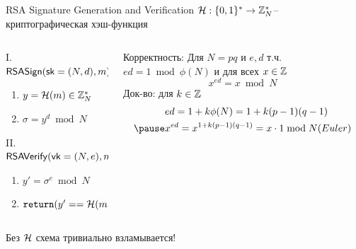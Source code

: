 \documentclass[usenames,dvipsnames,8pt,aspectratio=169]{beamer}
\begin{document}
\begin{frame}{RSA Signature Generation and Verification}
\large
$\mathcal{H}: \{0,1\}^\ast \rightarrow {{\mathbb Z}}_N^\ast$-- криптографическая хэш-функция
\vspace{10pt}
\begin{columns}[t]
\begin{column}{0.45\textwidth}
	
	{\color{Orange} I. $\mathsf{RSASign}(\textsf{sk}=(N, d), m):$}
	\begin{enumerate}
		\itemsep5pt
		\item $y = \mathcal{H}(m) \in {{\mathbb Z}}_N^\ast$
		\item $\sigma = y^d \bmod N$
	\end{enumerate}
	\vspace{10pt}
	\pause
	{\color{Orange} II. $\mathsf{RSAVerify}(\textsf{vk}=(N, e), m, \sigma):$}
	\begin{enumerate}
		\itemsep5pt
		\item $y' = \sigma^e \bmod N$
		\item $\mathtt{return}(y'==\mathcal{H}(m))$ \\
	\end{enumerate}
\end{column}
\begin{column}{0.55\textwidth}
	\pause
	{\color{Orange} Корректность:}
	Для $N=pq$ и $e,d$ т.ч.\ $ed = 1 \bmod \phi(N)$ и для всех $x \in {{\mathbb Z}}$
	{\color{Orange} 
		\[
		x^{ed} = x \bmod N
		\] }
	\pause
	Док-во: для $k \in {{\mathbb Z}}$
	\begin{align*}
	&ed = 1 + k \phi(N) = 1+k(p-1)(q-1) \\  \pause
	& x^{ed} = x^{1+k(p-1)(q-1)} = x \cdot 1 \bmod N (Euler) \\
	\end{align*}
\end{column}
\end{columns}
\LARGE
\vspace{10pt}
\centering
\vfill
Без $\mathcal{H}$ схема тривиально взламывается!
\end{frame}
\end{document}
